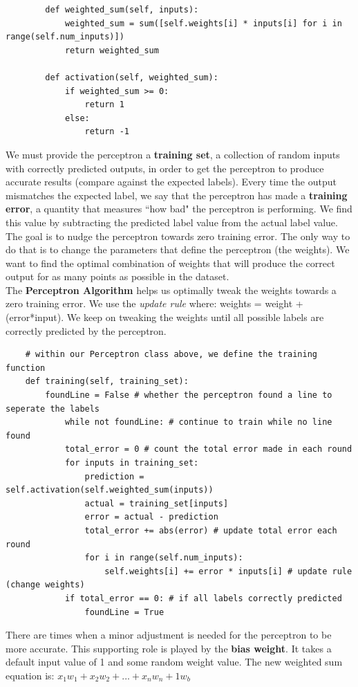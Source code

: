 \documentclass[11pt, a4paper]{article}
\begin{document}
\begin{spacing}{1.1}
\begin{lstlisting}
		def weighted_sum(self, inputs):
			weighted_sum = sum([self.weights[i] * inputs[i] for i in range(self.num_inputs)])
			return weighted_sum
		
		def activation(self, weighted_sum):
			if weighted_sum >= 0:
				return 1
			else:
				return -1 \end{lstlisting} \vspace*{1mm}
	We must provide the perceptron a \textbf{training set}, a collection of random inputs with correctly predicted outputs, in order to get the perceptron to produce accurate results (compare against the expected labels). Every time the output mismatches the expected label, we say that the perceptron has made a \textbf{training error}, a quantity that measures ``how bad" the perceptron is performing. We find this value by subtracting the predicted label value from the actual label value. \vspace*{1.5mm} \\
	The goal is to nudge the perceptron towards zero training error. The only way to do that is to change the parameters that define the perceptron (the weights). We want to find the optimal combination of weights that will produce the correct output for as many points as possible in the dataset. \vspace*{1.5mm} \\
	The \textbf{Perceptron Algorithm} helps us optimally tweak the weights towards a zero training error. We use the \textit{update rule} where: weights = weight + (error*input). We keep on tweaking the weights until all possible labels are correctly predicted by the perceptron. \newpage
	\begin{lstlisting}
	# within our Perceptron class above, we define the training function
	def training(self, training_set):
		foundLine = False # whether the perceptron found a line to seperate the labels
			while not foundLine: # continue to train while no line found
			total_error = 0 # count the total error made in each round
			for inputs in training_set:
				prediction = self.activation(self.weighted_sum(inputs))
				actual = training_set[inputs]
				error = actual - prediction
				total_error += abs(error) # update total error each round
				for i in range(self.num_inputs):
					self.weights[i] += error * inputs[i] # update rule (change weights)
			if total_error == 0: # if all labels correctly predicted
				foundLine = True \end{lstlisting} \vspace*{1mm}
	There are times when a minor adjustment is needed for the perceptron to be more accurate. This supporting role is played by the \textbf{bias weight}. It takes a default input value of 1 and some random weight value. The new weighted sum equation is: $x_1w_1 + x_2w_2 + ... + x_nw_n + 1w_b$

\end{spacing}
\end{document}
